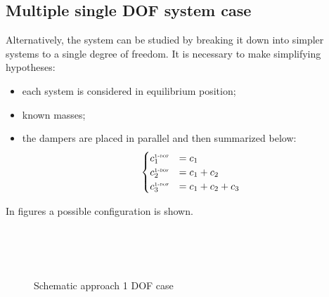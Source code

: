 \subsection{Multiple single DOF system case}
Alternatively, the system can be studied by breaking it down into simpler 
systems to a single degree of freedom. 
It is necessary to make simplifying hypotheses:
\begin{itemize}
\item each system is considered in equilibrium position;
\item known masses;
\item the dampers are placed in parallel and then summarized below:
\begin{equation}
\label{eq:eq_damp_1_dof}
\begin{cases}
c_1^{\text{\tiny 1-\textsc{dof}}} &= c_1\\
c_2^{\text{\tiny 1-\textsc{dof}}} &= c_1 + c_2\\
c_3^{\text{\tiny 1-\textsc{dof}}} &= c_1 + c_2 + c_3\\
\end{cases}
\end{equation}
\end{itemize}
In figures a possible configuration is shown.
\begin{figure}[htb]
	\centering
	 \\
			\\
			\\
	\label{fig:modelscheme_1dof}
	\caption{Schematic approach 1 DOF case}
\end{figure}
